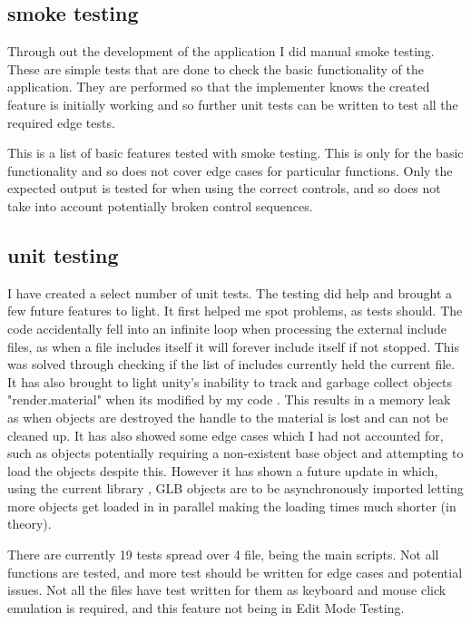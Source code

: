 \subsection{smoke testing}
Through out the development of the application I did manual smoke testing. These are simple tests that are done to check the basic functionality of the application. They are performed so that the implementer knows the created feature is initially working and so further unit tests can be written to test all the required edge tests.

This is a list of basic features tested with smoke testing. This is only for the basic functionality and so does not cover edge cases for particular functions. Only the expected output is tested for when using the correct controls, and so does not take into account potentially broken control sequences.


\subsection{unit testing}
I have created a select number of unit tests. The testing did help and brought a few future features to light. It first helped me spot problems, as tests should. The code accidentally fell into an infinite loop when processing the external include files, as when a file includes itself it will forever include itself if not stopped. This was solved through checking if the list of includes currently held the current file. It has also brought to light unity's inability to track and garbage collect objects "render.material" when its modified by my code \cite{Unity_Mat_Technologies}. This results in a memory leak as when objects are destroyed the handle to the material is lost and can not be cleaned up. It has also showed some edge cases which I had not accounted for, such as objects potentially requiring a non-existent base object and attempting to load the objects despite this. However it has shown a future update in which, using the current library \cite{siccity_2021_github}, GLB objects are to be asynchronously imported letting more objects get loaded in in parallel making the loading times much shorter (in theory).

There are currently 19 tests spread over 4 file, being the main scripts. Not all functions are tested, and more test should be written for edge cases and potential issues. Not all the files have test written for them as keyboard and mouse click emulation is required, and this feature not being in Edit Mode Testing.

